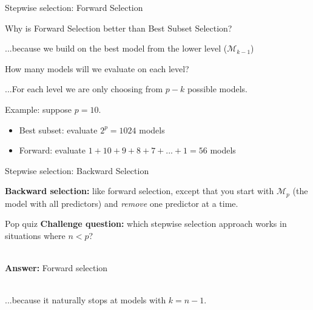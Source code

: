 \documentclass[mathserif, aspectratio=169]{beamer}
\begin{document}
\begin{frame}{Stepwise selection: Forward Selection}
\end{frame}

\begin{frame}{Why is Forward Selection better than Best Subset Selection?}

\pause

...because we build on the best model from the lower level ($\mathcal{M}_{k-1}$)

\vspace{5mm}

How many models will we evaluate on each level?
\pause 

\vspace{5mm}

...For each level we are only choosing from $p-k$ possible models.  

\vspace{5mm}

Example:  suppose $p = 10$.  
\begin{itemize}
\item Best subset: evaluate $2^p = 1024$ models
\item Forward: evaluate $1 + 10 + 9 + 8 + 7 + ... + 1 = 56$ models
\end{itemize}



\end{frame}

\begin{frame}{Stepwise selection: Backward  Selection}

\pause
\textbf{Backward selection:} like forward selection, except that you start with $\mathcal{M}_p$ (the model with all predictors) and \textit{remove} one predictor at a time.

\end{frame}


\begin{frame}{Pop quiz}
\textbf{Challenge question:} which stepwise selection approach works in situations where $n<p$?\\~\\

\pause

\textbf{Answer:} Forward selection\\~\\

\pause

...because it naturally stops at models with $k=n-1$. 

\end{frame}
\end{document}
